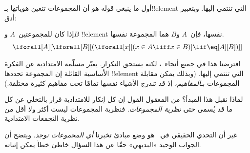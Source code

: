 \documentclass[../../../include/open-logic-section]{subfiles}
\begin{document}

أول ما ينبغي قوله هو أن المجموعات تتعين هوياتها بـ!!{element} التي
تنتمي إليها. وبتعبير أدق:

\begin{axiom}[الامتدادية]
إذا كان للمجموعتين~$A$ و$B$ !!{element} نفسها، فإن~$A$ و$B$
هما المجموعة نفسها.
\[
  \lforall[A][\lforall[B][(\lforall[x][(x \in A \liff x \in B)] \lif
  \eq[A][B])]]
\]
\end{axiom}

افترضنا هذا في جميع أنحاء~، لكنه يستحق التكرار.
يعبّر مسلّمة الامتدادية عن الفكرة الأساسية القائلة إن المجموعة تحددها
!!{element} التي تنتمي إليها. (وبذلك يمكن مقابلة المجموعات
بـ\emph{المفاهيم}، إذ قد تندرج الأشياء نفسها تمامًا تحت مفاهيم كثيرة
مختلفة.)

لماذا نقبل هذا المبدأ؟ من المعقول القول إن كل إنكار للامتدادية قرار
بالتخلي عن كل ما قد يُسمى حتى \emph{نظرية المجموعات}. فنظرية المجموعات
ليست أكثر ولا أقل من نظرية التجمعات الامتدادية.

غير أن التحدي الحقيقي في~ هو وضع مبادئ تخبرنا
\emph{أي المجموعات توجد}. ويتضح أن الجواب الوحيد «البديهي» حقًا عن هذا
السؤال خاطئ خطأ يمكن إثباته.
\end{document}
